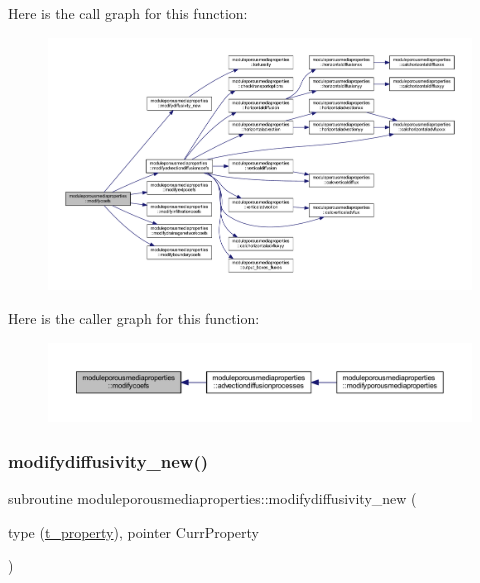 Here is the call graph for this function\+:\nopagebreak
\begin{figure}[H]
\begin{center}
\leavevmode
\includegraphics[width=350pt]{namespacemoduleporousmediaproperties_adff3b6aa5d450f391ceaa763c275a82a_cgraph}
\end{center}
\end{figure}
Here is the caller graph for this function\+:\nopagebreak
\begin{figure}[H]
\begin{center}
\leavevmode
\includegraphics[width=350pt]{namespacemoduleporousmediaproperties_adff3b6aa5d450f391ceaa763c275a82a_icgraph}
\end{center}
\end{figure}
\mbox{\label{namespacemoduleporousmediaproperties_aed31037cfdb4a26f847b51c25507a881}} 
\subsubsection{\texorpdfstring{modifydiffusivity\+\_\+new()}{modifydiffusivity\_new()}}
{\footnotesize\ttfamily subroutine moduleporousmediaproperties\+::modifydiffusivity\+\_\+new (\begin{DoxyParamCaption}\item[{type (\mbox{\hyperlink{structmoduleporousmediaproperties_1_1t__property}{t\+\_\+property}}), pointer}]{Curr\+Property }\end{DoxyParamCaption})\hspace{0.3cm}{\ttfamily [private]}}

